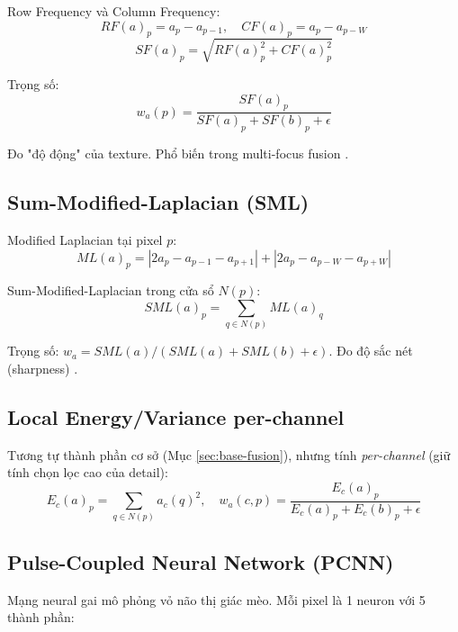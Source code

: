 \documentclass[12pt,a4paper]{article}
\begin{document}
Row Frequency và Column Frequency:
\begin{equation}
RF(a)_p = a_p - a_{p-1}, \quad CF(a)_p = a_p - a_{p-W}
\end{equation}
\begin{equation}
SF(a)_p = \sqrt{RF(a)_p^2 + CF(a)_p^2}
\end{equation}

Trọng số:
\begin{equation}
w_a(p) = \frac{SF(a)_p}{SF(a)_p + SF(b)_p + \epsilon}
\end{equation}

Đo "độ động" của texture. Phổ biến trong multi-focus fusion \cite{eskicioglu1995sf}.

\subsection{Sum-Modified-Laplacian (SML)}

Modified Laplacian tại pixel $p$:
\begin{equation}
ML(a)_p = |2a_p - a_{p-1} - a_{p+1}| + |2a_p - a_{p-W} - a_{p+W}|
\end{equation}

Sum-Modified-Laplacian trong cửa sổ $N(p)$:
\begin{equation}
SML(a)_p = \sum_{q \in N(p)} ML(a)_q
\end{equation}

Trọng số: $w_a = SML(a) / (SML(a) + SML(b) + \epsilon)$. Đo độ sắc nét (sharpness) \cite{huang2007sml}.

\subsection{Local Energy/Variance per-channel}

Tương tự thành phần cơ sở (Mục \ref{sec:base-fusion}), nhưng tính \emph{per-channel} (giữ tính chọn lọc cao của detail):
\begin{equation}
E_c(a)_p = \sum_{q \in N(p)} a_c(q)^2, \quad w_a(c, p) = \frac{E_c(a)_p}{E_c(a)_p + E_c(b)_p + \epsilon}
\end{equation}

\subsection{Pulse-Coupled Neural Network (PCNN)}

Mạng neural gai \cite{eckhorn1990pcnn} mô phỏng vỏ não thị giác mèo. Mỗi pixel là 1 neuron với 5 thành phần:
\end{document}
